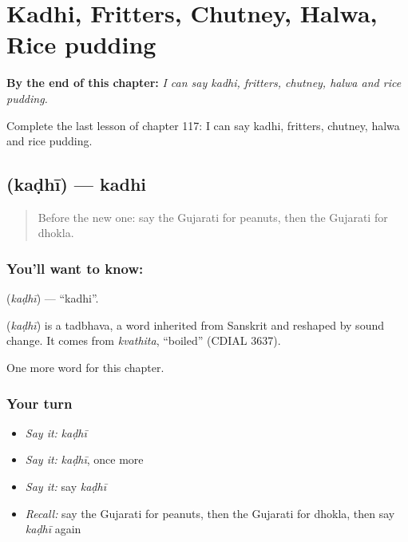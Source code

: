 
\chapter{Kadhi, Fritters, Chutney, Halwa, Rice pudding}
\label{ch:gu-kadhi-fritters-chutney-halwa-rice-pudding}

\begin{chapteropening}
\textbf{By the end of this chapter:} \emph{I can say kadhi, fritters, chutney, halwa and rice pudding.}

Complete the last lesson of chapter 117: I can say kadhi, fritters, chutney, halwa and rice pudding.
\end{chapteropening}

\section[\texorpdfstring{\gu{કઢી} (kaḍhī)}{કઢી (kaḍhī)}]{ (kaḍhī) — kadhi}

\label{lesson:GU-C117-kadhi}



\begin{quote}
Before the new one: say the Gujarati for peanuts, then the Gujarati for dhokla.
\end{quote}

\subsection*{You'll want to know: }
\textbf{} (\emph{kaḍhī}) — \textquotedblleft{}kadhi\textquotedblright{}.

\begin{cousinweb}
\textbf{} (\emph{kaḍhī}) is a tadbhava, a word inherited from Sanskrit and reshaped by sound change. It comes from \emph{kvathita}, \textquotedblleft{}boiled\textquotedblright{} (CDIAL 3637).
\end{cousinweb}

\begin{grammarlens}[title={What you've built}]
One more word for this chapter.
\end{grammarlens}

\subsection*{Your turn}
\begin{itemize}
\raggedright
  \item \emph{Say it:} \emph{kaḍhī}
  \item \emph{Say it:} \emph{kaḍhī}, once more
  \item \emph{Say it:} say \emph{kaḍhī}
  \item \emph{Recall:} say the Gujarati for peanuts, then the Gujarati for dhokla, then say \emph{kaḍhī} again
\end{itemize}

